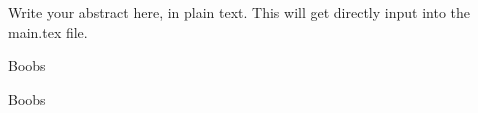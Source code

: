 Write your abstract here, in plain text. This will get directly input into the main.tex file.

Boobs




Boobs